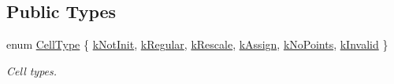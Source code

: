\subsection*{Public Types}
\begin{DoxyCompactItemize}
\item 
enum \hyperlink{classSNDTCell_a89f320f167cfeb7ccdbb4a578a169341}{Cell\+Type} \{ \newline
\hyperlink{classSNDTCell_a89f320f167cfeb7ccdbb4a578a169341a53bf816cc3a9867ecd573220fe881e8b}{k\+Not\+Init}, 
\hyperlink{classSNDTCell_a89f320f167cfeb7ccdbb4a578a169341a99a6ec56e2a9a380f5fbc7f827a86658}{k\+Regular}, 
\hyperlink{classSNDTCell_a89f320f167cfeb7ccdbb4a578a169341a527afab9b00636ef201425a7eaa17140}{k\+Rescale}, 
\hyperlink{classSNDTCell_a89f320f167cfeb7ccdbb4a578a169341a04a70c3035d2e759bdbcdd127ed9389b}{k\+Assign}, 
\newline
\hyperlink{classSNDTCell_a89f320f167cfeb7ccdbb4a578a169341a4a0afb86f4d1c54e34925659965bb8af}{k\+No\+Points}, 
\hyperlink{classSNDTCell_a89f320f167cfeb7ccdbb4a578a169341a7623a87417a293d0a5d04f96d5b70c30}{k\+Invalid}
 \}\begin{DoxyCompactList}\small\item\em Cell types. \end{DoxyCompactList}
\end{DoxyCompactItemize}
